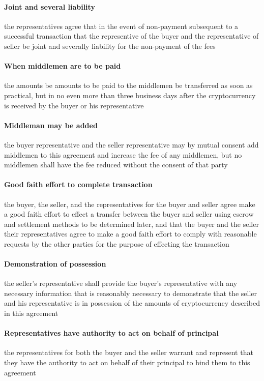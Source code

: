\documentclass[10pt]{article}
\begin{document}
\paragraph{Joint and several liability} the representatives agree that
in the event of non-payment subsequent to a successful transaction
that the representive of the buyer and the representative of seller be
joint and severally liability for the non-payment of the fees

\paragraph{When middlemen are to be paid} the amounts be amounts to be
paid to the middlemen be transferred as soon as practical, but in no
even more than three business days after the cryptocurrency is
received by the buyer or his representative

\paragraph{Middleman may be added} the buyer representative and the
seller representative may by mutual consent add middlemen to this
agreement and increase the fee of any middlemen, but no middlemen
shall have the fee reduced without the consent of that party

\paragraph{Good faith effort to complete transaction} the buyer, the seller, and the representatives for the buyer and seller agree make a good faith effort to effect a transfer between the buyer and seller using escrow and settlement methods to be determined later, and that the buyer and the seller their representatives agree to make a good faith effort to comply with reasonable requests by the other parties for the purpose of effecting the transaction

\paragraph{Demonstration of possession} the seller’s representative shall provide the buyer’s representative with any necessary information that is reasonably necessary to demonstrate that the seller and his representative is in possession of the amounts of cryptocurrency described in this agreement

\paragraph{Representatives have authority to act on behalf of principal} the representatives for both the buyer and the seller warrant and represent that they have the authority to act on behalf of their principal to bind them to this agreement
\end{document}
